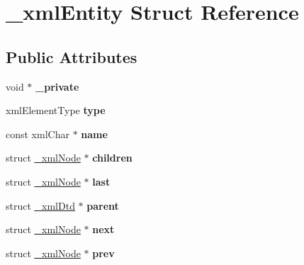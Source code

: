 \hypertarget{struct__xmlEntity}{
\section{\_\-xmlEntity Struct Reference}
\label{struct__xmlEntity}
}
\subsection*{Public Attributes}
\begin{DoxyCompactItemize}
\item 
\hypertarget{struct__xmlEntity_a8d8ebc67add6e39cfa504b01499b8747}{
void $\ast$ {\bfseries \_\-private}}
\label{struct__xmlEntity_a8d8ebc67add6e39cfa504b01499b8747}

\item 
\hypertarget{struct__xmlEntity_ac3b4e1ec2a9713ed75c05395c925f994}{
xmlElementType {\bfseries type}}
\label{struct__xmlEntity_ac3b4e1ec2a9713ed75c05395c925f994}

\item 
\hypertarget{struct__xmlEntity_a81a435176b4605b20a9f9dbb6ad001d9}{
const xmlChar $\ast$ {\bfseries name}}
\label{struct__xmlEntity_a81a435176b4605b20a9f9dbb6ad001d9}

\item 
\hypertarget{struct__xmlEntity_a917dfc510417945d25dd2e687157b68d}{
struct \hyperlink{struct__xmlNode}{\_\-xmlNode} $\ast$ {\bfseries children}}
\label{struct__xmlEntity_a917dfc510417945d25dd2e687157b68d}

\item 
\hypertarget{struct__xmlEntity_a8c396e1792dc1c14c8187afe40e63f80}{
struct \hyperlink{struct__xmlNode}{\_\-xmlNode} $\ast$ {\bfseries last}}
\label{struct__xmlEntity_a8c396e1792dc1c14c8187afe40e63f80}

\item 
\hypertarget{struct__xmlEntity_aad8c155ad98cec309a9a60c03c262d7d}{
struct \hyperlink{struct__xmlDtd}{\_\-xmlDtd} $\ast$ {\bfseries parent}}
\label{struct__xmlEntity_aad8c155ad98cec309a9a60c03c262d7d}

\item 
\hypertarget{struct__xmlEntity_afef709661a94fe35cd1ae664f536d6b3}{
struct \hyperlink{struct__xmlNode}{\_\-xmlNode} $\ast$ {\bfseries next}}
\label{struct__xmlEntity_afef709661a94fe35cd1ae664f536d6b3}

\item 
\hypertarget{struct__xmlEntity_a4e2e6c655941635a7627957b2fd4ac16}{
struct \hyperlink{struct__xmlNode}{\_\-xmlNode} $\ast$ {\bfseries prev}}
\label{struct__xmlEntity_a4e2e6c655941635a7627957b2fd4ac16}


\end{DoxyCompactItemize}
